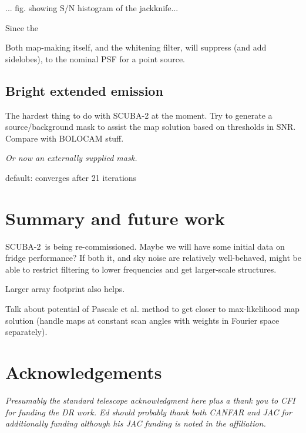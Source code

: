 \documentclass[useAMS,usenatbib,nofootinbib]{mn2e}
\newcommand{\snr}{SNR}
\newcommand{\scuba}{SCUBA-2}
\begin{document}
... fig. showing S/N histogram of the jackknife...

Since the

Both map-making itself, and the whitening filter, will suppress (and
add sidelobes), to the nominal PSF for a point source. 

\subsection{Bright extended emission}
The hardest thing to do with SCUBA-2 at the moment. Try to generate a
source/background mask to assist the map solution based on thresholds
in \snr. Compare with BOLOCAM stuff.

\textit{Or now an externally supplied mask.}

default: converges after 21 iterations

\section{Summary and future work}
\label{sec:summary}

\scuba\ is being re-commissioned. Maybe we will have some initial data
on fridge performance? If both it, and sky noise are relatively
well-behaved, might be able to restrict filtering to lower frequencies
and get larger-scale structures.

Larger array footprint also helps.

Talk about potential of Pascale et al. method to get closer to
max-likelihood map solution (handle maps at constant scan angles with
weights in Fourier space separately).

\section{Acknowledgements}

\textit{Presumably the standard telescope acknowledgment here plus a thank you
to CFI for funding the DR work. Ed should probably thank both CANFAR
and JAC for additionally funding although his JAC funding is noted in
the affiliation.}



\end{document}
